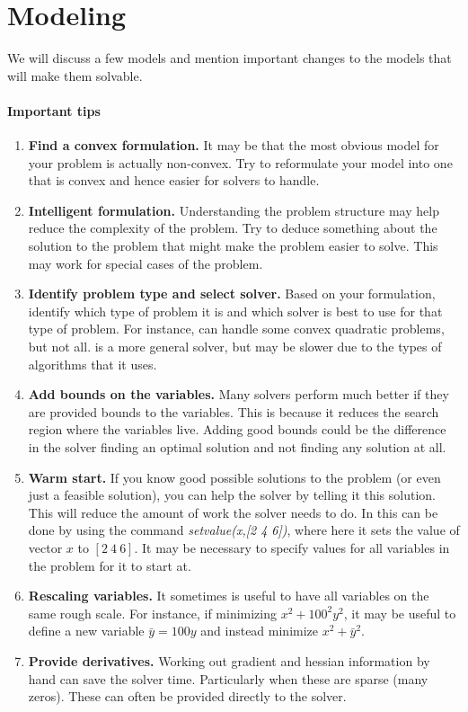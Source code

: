 \section{Modeling}
We will discuss a few models and mention important changes to the models that will make them solvable.  

\paragraph{Important tips}
\begin{enumerate}
\item \textbf{Find a convex formulation.}  It may be that the most obvious model for your problem is actually non-convex.  Try to reformulate your model into one that is convex and hence easier for solvers to handle.
\item \textbf{Intelligent formulation.}  Understanding the problem structure may help reduce the complexity of the problem.  Try to deduce something about the solution to the problem that might make the problem easier to solve.  This may work for special cases of the problem.
\item \textbf{Identify problem type and select solver.}  Based on your formulation, identify which type of problem it is and which solver is best to use for that type of problem.  For instance, \gurobi can handle some convex quadratic problems, but not all.  \ipopt is a more general solver, but may be slower due to the types of algorithms that it uses.

\item \textbf{Add bounds on the variables.} Many solvers perform much better if they are provided bounds to the variables.  This is because it reduces the search region where the variables live.   Adding good bounds could be the difference in the solver finding an optimal solution and not finding any solution at all.
\item \textbf{Warm start.} If you know good possible solutions to the problem (or even just a feasible solution), you can help the solver by telling it this solution.  This will reduce the amount of work the solver needs to do.  In \jump this can be done by using the command \textit{setvalue(x,[2 4 6])}, where here it sets the value of vector $x$ to $[2\ 4\ 6]$.  It may be necessary to specify values for all variables in the problem for it to start at.
\item \textbf{Rescaling variables.} It sometimes is useful to have all variables on the same rough scale.  For instance, if minimizing $x^2 + 100^2 y^2$, it may be useful to define a new variable $\bar y = 100y$ and instead minimize $x^2 + \bar y^2$.
\item \textbf{Provide derivatives.} Working out gradient and hessian information by hand can save the solver time.  Particularly when these are sparse (many zeros).  These can often be provided directly to the solver.
\end{enumerate}

